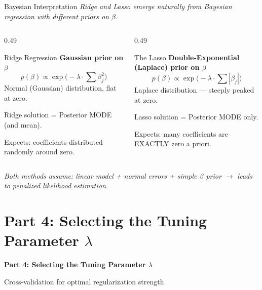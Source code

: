 \documentclass[ignorenonframetext,]{beamer}
\begin{document}
\begin{frame}{Bayesian Interpretation}
\emph{Ridge and Lasso emerge naturally from Bayesian regression with different priors on $\beta$.}

\begin{columns}[T]
\begin{column}{0.49\textwidth}
\begin{block}{\small Ridge Regression}
\footnotesize
\textbf{Gaussian prior on $\beta$}
$$p(\beta) \propto \exp\Big(-\lambda\cdot\sum\beta_j^2\Big)$$
Normal (Gaussian) distribution, flat at zero.

Ridge solution = Posterior MODE (and mean).

Expects: coefficients distributed randomly around zero.
\end{block}
\end{column}
\begin{column}{0.49\textwidth}
\begin{exampleblock}{\small The Lasso}
\footnotesize
\textbf{Double-Exponential (Laplace) prior on $\beta$}
$$p(\beta) \propto \exp\Big(-\lambda\cdot\sum|\beta_j|\Big)$$
Laplace distribution --- steeply peaked at zero.

Lasso solution = Posterior MODE only.

Expects: many coefficients are EXACTLY zero a priori.
\end{exampleblock}
\end{column}
\end{columns}

\vspace{4pt}
{\scriptsize\emph{Both methods assume: linear model + normal errors + simple $\beta$ prior $\rightarrow$ leads to penalized likelihood estimation.}}
\end{frame}

\section{\texorpdfstring{Part 4: Selecting the Tuning Parameter $\lambda$}{Part 4: Selecting the Tuning Parameter lambda}}

\begin{frame}
\centering
{\Large{}\textbf{Part 4: Selecting the Tuning Parameter $\lambda$}}

\vspace{12pt}
Cross-validation for optimal regularization strength
\end{frame}
\end{document}
